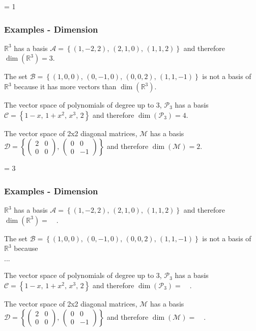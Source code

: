 \documentclass[usenames,dvipsnames,aspectratio=169,10pt]{beamer}
\def \EXAMPLEVERSION {3} %
\numberwithin{equation}{section}
\begin{document}
\ifnum \EXAMPLEVERSION = 1
\begin{frame}
\frametitle{Examples - Dimension}

$\mathbb{R}^3$ has a basis $\mathcal{A} = \left\{(1,-2,2), \, (2,1,0), \, (1,1,2) \right\}$ and therefore $\dim(\mathbb{R}^3)=3$.

The set $\mathcal{B} = \left\{(1,0,0), \, (0,-1,0), \, (0,0,2), \, (1,1,-1) \right\}$ is not a basis of $\mathbb{R}^3$ because it has more vectors than $\dim(\mathbb{R}^3)$.

The vector space of polynomials of degree up to 3, $\mathcal{P}_3$ has a basis $\mathcal{C} = \left\{1-x, \, 1+x^2, \, x^3, \, 2 \right\}$ and therefore $\dim(\mathcal{P}_3)=4$.

The vector space of 2x2 diagonal matrices, $\mathcal{M}$ has a basis $\mathcal{D} = \left\{\begin{pmatrix} 2 & 0 \\ 0 & 0 \end{pmatrix}, \, \begin{pmatrix} 0 & 0 \\ 0 & -1 \end{pmatrix} \right\}$ and therefore $\dim(\mathcal{M})=2$.

\end{frame}
\fi 



\ifnum \EXAMPLEVERSION = 3
\begin{frame}
\frametitle{Examples - Dimension}
$\mathbb{R}^3$ has a basis $\mathcal{A} = \left\{(1,-2,2), \, (2,1,0), \, (1,1,2) \right\}$ and therefore $\dim(\mathbb{R}^3) = \quad$.

The set $\mathcal{B} = \left\{(1,0,0), \, (0,-1,0), \, (0,0,2), \, (1,1,-1) \right\}$ is not a basis of $\mathbb{R}^3$ because \\ ...

The vector space of polynomials of degree up to 3, $\mathcal{P}_3$ has a basis $\mathcal{C} = \left\{1-x, \, 1+x^2, \, x^3, \, 2 \right\}$ and therefore $\dim(\mathcal{P}_3) = \quad$.

The vector space of 2x2 diagonal matrices, $\mathcal{M}$ has a basis $\mathcal{D} = \left\{\begin{pmatrix} 2 & 0 \\ 0 & 0 \end{pmatrix}, \, \begin{pmatrix} 0 & 0 \\ 0 & -1 \end{pmatrix} \right\}$ and therefore $\dim(\mathcal{M}) = \quad$.
\end{frame}
\fi 
\end{document}
